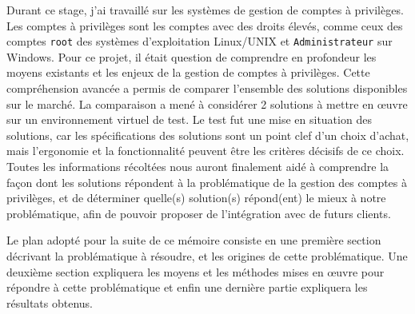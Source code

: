 Durant ce stage, j'ai travaillé sur les systèmes de gestion de comptes à privilèges.
Les comptes à privilèges sont les comptes avec des droits élevés, comme ceux des comptes \texttt{root} des systèmes d'exploitation Linux/UNIX et \texttt{Administrateur} sur Windows.
Pour ce projet, il était question de comprendre en profondeur les moyens existants et les enjeux de la gestion de comptes à privilèges.
Cette compréhension avancée a permis de comparer l'ensemble des solutions disponibles sur le marché.
La comparaison a mené à considérer 2 solutions à mettre en œuvre sur un environnement virtuel de test.
Le test fut une mise en situation des solutions, car les spécifications des solutions sont un point clef d'un choix d'achat, mais l'ergonomie et la fonctionnalité peuvent être les critères décisifs de ce choix.
Toutes les informations récoltées nous auront finalement aidé à comprendre la façon dont les solutions répondent à la problématique de la gestion des comptes à privilèges, et de déterminer quelle(s) solution(s) répond(ent) le mieux à notre problématique, afin de pouvoir proposer de l'intégration avec de futurs clients.

Le plan adopté pour la suite de ce mémoire consiste en une première section décrivant la problématique à résoudre, et les origines de cette problématique. Une deuxième section expliquera les moyens et les méthodes mises en œuvre pour répondre à cette problématique et enfin une dernière partie expliquera les résultats obtenus.